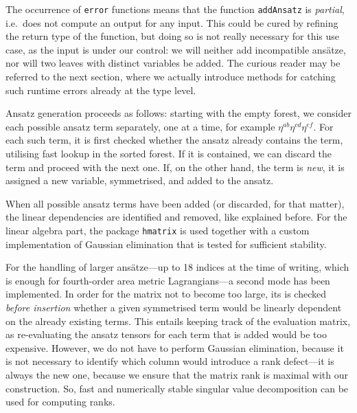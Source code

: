 The occurrence of \texttt{error} functions means that the function \texttt{addAnsatz} is \emph{partial}, i.e.\ does not compute an output for any input. This could be cured by refining the return type of the function, but doing so is not really necessary for this use case, as the input is under our control: we will neither add incompatible ansätze, nor will two leaves with distinct variables be added. The curious reader may be referred to the next section, where we actually introduce methods for catching such runtime errors already at the type level.

Ansatz generation proceeds as follows: starting with the empty forest, we consider each possible ansatz term separately, one at a time, for example $\eta^{ab} \eta^{cd} \eta^{ef}$. For each such term, it is first checked whether the ansatz already contains the term, utilising fast lookup in the sorted forest. If it is contained, we can discard the term and proceed with the next one. If, on the other hand, the term is \emph{new}, it is assigned a new variable, symmetrised, and added to the ansatz.

When all possible ansatz terms have been added (or discarded, for that matter), the linear dependencies are identified and removed, like explained before. For the linear algebra part, the package \texttt{hmatrix} \cite{Ruiz_2006} is used together with a custom implementation of Gaussian elimination that is tested for sufficient stability.

For the handling of larger ansätze---up to 18 indices at the time of writing, which is enough for fourth-order area metric Lagrangians---a second mode has been implemented. In order for the matrix not to become too large, its is checked \emph{before insertion} whether a given symmetrised term would be linearly dependent on the already existing terms. This entails keeping track of the evaluation matrix, as re-evaluating the ansatz tensors for each term that is added would be too expensive. However, we do not have to perform Gaussian elimination, because it is not necessary to identify which column would introduce a rank defect---it is always the new one, because we ensure that the matrix rank is maximal with our construction. So, fast and numerically stable singular value decomposition can be used for computing ranks.

